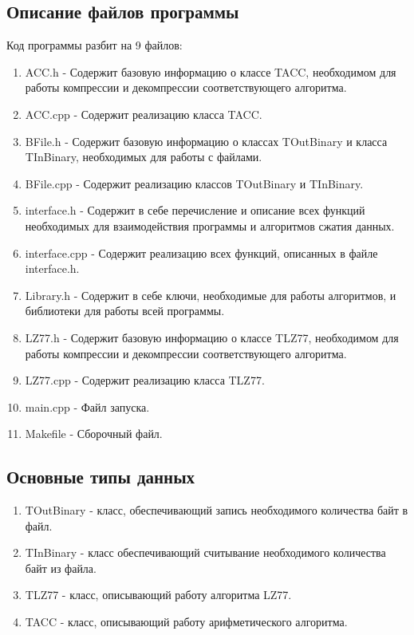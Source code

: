 \documentclass[12pt]{article}
\begin{document}
\subsection*{Описание файлов программы}

Код программы разбит на 9 файлов:

\begin{enumerate}
	\item ACC.h - Содержит базовую информацию о классе TACC, необходимом для работы компрессии и декомпрессии соответствующего алгоритма. 
	\item ACC.cpp - Содержит реализацию класса TACC.
	\item BFile.h - Содержит базовую информацию о классах TOutBinary и класса TInBinary, необходимых для работы с файлами.
	\item BFile.cpp - Содержит реализацию классов TOutBinary и TInBinary.
	\item interface.h - Содержит в себе перечисление и описание всех функций необходимых для взаимодействия программы и алгоритмов сжатия данных.
	\item interface.cpp - Содержит реализацию всех функций, описанных в файле interface.h.
	\item Library.h - Содержит в себе ключи, необходимые для работы алгоритмов, и библиотеки для работы всей программы.
	\item LZ77.h - Содержит базовую информацию о классе TLZ77, необходимом для работы компрессии и декомпрессии соответствующего алгоритма.
	\item LZ77.cpp - Содержит реализацию класса TLZ77.
	\item main.cpp - Файл запуска.
	\item Makefile - Сборочный файл.
\end{enumerate}

\subsection*{Основные типы данных}

\begin{enumerate}
	\item TOutBinary - класс, обеспечивающий запись необходимого количества байт в файл.
	\item TInBinary - класс обеспечивающий считывание необходимого количества байт из файла.
	\item TLZ77 - класс, описывающий работу алгоритма LZ77.
	\item TACC - класс, описывающий работу арифметического алгоритма.
\end{enumerate}
\end{document}
